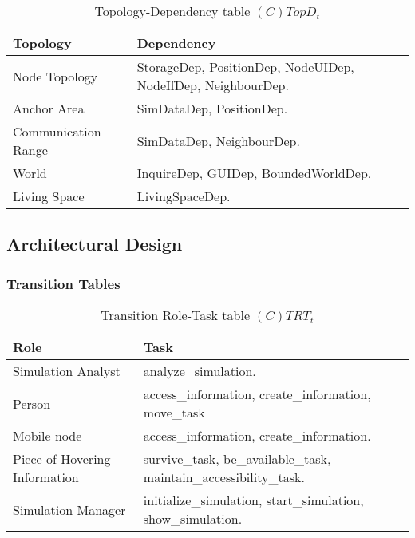\begin{table}[H]
	\centering
	\begin{tabular}{|p{4cm}|p{8cm}|}
			\hline
			\textbf{Topology} & \textbf{Dependency} \\
			\hline
			Node Topology & StorageDep, PositionDep, NodeUIDep, NodeIfDep, NeighbourDep. \\
			\hline
			Anchor Area & SimDataDep, PositionDep.\\
			\hline
			Communication Range & SimDataDep, NeighbourDep. \\
			\hline
			World & InquireDep, GUIDep, BoundedWorldDep. \\
			\hline
			Living Space & LivingSpaceDep. \\
			\hline
		\end{tabular}
	\caption{Topology-Dependency table $(C)TopD_t$}
	\label{tab:ctopdt}
\end{table}

\subsection{Architectural Design}


\subsubsection{Transition Tables}

\begin{table}[H]
	\centering
	\begin{tabular}{|p{4cm}|p{8cm}|}
			\hline
			\textbf{Role} & \textbf{Task} \\
			\hline
			Simulation Analyst & analyze\_simulation.   \\
			\hline
			Person & access\_information, create\_information, move\_task \\
			\hline
			Mobile node & access\_information, create\_information.  \\
			\hline
			Piece of Hovering Information & survive\_task, be\_available\_task,
			maintain\_accessibility\_task. \\
			\hline
			Simulation Manager & initialize\_simulation, start\_simulation,
			show\_simulation. \\
			\hline
		\end{tabular}
	\caption{Transition Role-Task table $(C)TRT_t$}
	\label{tab:ctrtt}
\end{table}

